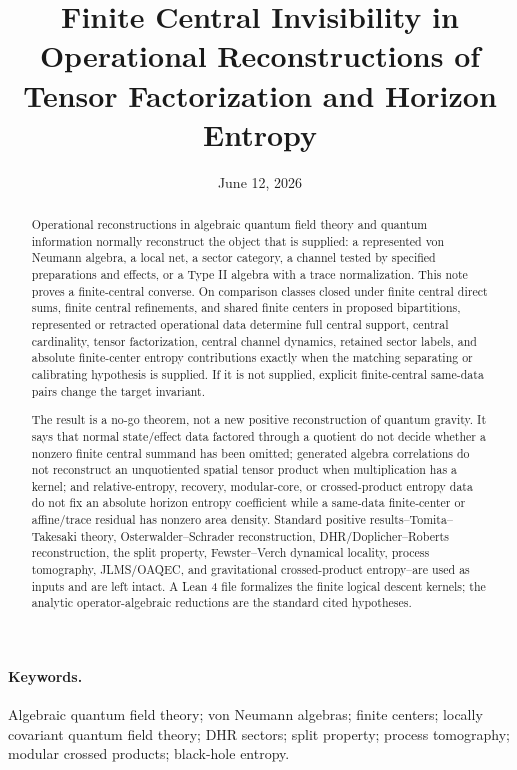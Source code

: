 \documentclass[12pt]{article}
\title{Finite Central Invisibility in Operational Reconstructions of Tensor
Factorization and Horizon Entropy}
\author{}
\date{June 12, 2026}
\theoremstyle{definition}
\theoremstyle{remark}
\begin{document}
\maketitle

\begin{abstract}
Operational reconstructions in algebraic quantum field theory and quantum
information normally reconstruct the object that is supplied: a represented von
Neumann algebra, a local net, a sector category, a channel tested by specified
preparations and effects, or a Type II algebra with a trace normalization.  This
note proves a finite-central converse.  On comparison classes closed under
finite central direct sums, finite central refinements, and shared finite
centers in proposed bipartitions, represented or retracted operational data
determine full central support, central cardinality, tensor factorization,
central channel dynamics, retained sector labels, and absolute finite-center
entropy contributions exactly when the matching separating or calibrating
hypothesis is supplied.  If it is not supplied, explicit finite-central
same-data pairs change the target invariant.

The result is a no-go theorem, not a new positive reconstruction of quantum
gravity.  It says that normal state/effect data factored through a quotient do
not decide whether a nonzero finite central summand has been omitted; generated
algebra correlations do not reconstruct an unquotiented spatial tensor product
when multiplication has a kernel; and relative-entropy, recovery, modular-core,
or crossed-product entropy data do not fix an absolute horizon entropy
coefficient while a same-data finite-center or affine/trace residual has
nonzero area density.  Standard positive results--Tomita--Takesaki theory,
Osterwalder--Schrader reconstruction, DHR/Doplicher--Roberts reconstruction,
the split property, Fewster--Verch dynamical locality, process tomography,
JLMS/OAQEC, and gravitational crossed-product entropy--are used as inputs and
are left intact.  A Lean 4 file formalizes the finite logical descent kernels;
the analytic operator-algebraic reductions are the standard cited hypotheses.
\end{abstract}

\paragraph{Keywords.}
Algebraic quantum field theory; von Neumann algebras; finite centers; locally
covariant quantum field theory; DHR sectors; split property; process
tomography; modular crossed products; black-hole entropy.
\end{document}
